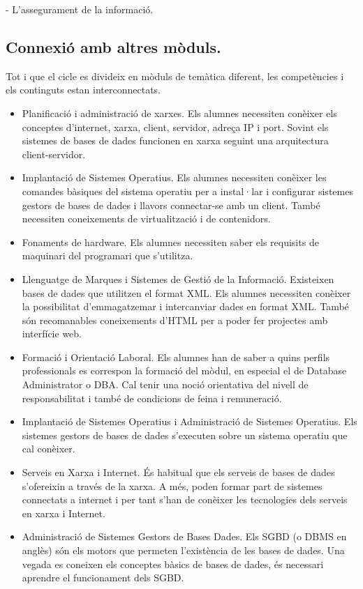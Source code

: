 \documentclass[catalan, a4paper, 12pt, titlepage]{article}
\begin{document}
- L'assegurament de la informació.

\subsection{Connexió amb altres mòduls.}

Tot i que el cicle es divideix en mòduls de temàtica diferent, les competències i els continguts estan interconnectats.

\begin{itemize}
	\item Planificació i administració de xarxes. Els alumnes necessiten conèixer els conceptes d'internet, xarxa, client, servidor, adreça IP i port. Sovint els sistemes de bases de dades funcionen en xarxa seguint una arquitectura client-servidor.
	\item Implantació de Sistemes Operatius. Els alumnes necessiten conèixer les comandes bàsiques del sistema operatiu per a instal·lar i configurar sistemes gestors de bases de dades i llavors connectar-se amb un client. També necessiten coneixements de virtualització i de contenidors.
	\item Fonaments de hardware. Els alumnes necessiten saber els requisits de maquinari del programari que s'utilitza.
	\item Llenguatge de Marques i Sistemes de Gestió de la Informació. Existeixen bases de dades que utilitzen el format XML. Els alumnes necessiten conèixer la possibilitat d'emmagatzemar i intercanviar dades en format XML. També són recomanables coneixements d'HTML per a poder fer projectes amb interfície web.
	\item Formació i Orientació Laboral. Els alumnes han de saber a quins perfils professionals es correspon la formació del mòdul, en especial el de Database Administrator o DBA. Cal tenir una noció orientativa del nivell de responsabilitat i també de condicions de feina i remuneració.
	\item Implantació de Sistemes Operatius i Administració de Sistemes Operatius. Els sistemes gestors de bases de dades s'executen sobre un sistema operatiu que cal conèixer.
	\item Serveis en Xarxa i Internet. És habitual que els serveis de bases de dades s'ofereixin a través de la xarxa. A més, poden formar part de sistemes connectats a internet i per tant s'han de conèixer les tecnologies dels serveis en xarxa i Internet.
	\item Administració de Sistemes Gestors de Bases Dades. Els SGBD (o DBMS en anglès) són els motors que permeten l'existència de les bases de dades. Una vegada es coneixen els conceptes bàsics de bases de dades, és necessari aprendre el funcionament dels SGBD.

\end{itemize}
\end{document}
